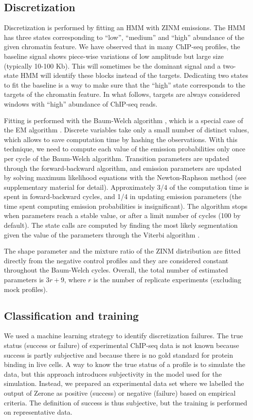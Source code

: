 \documentclass{bioinfo}
\begin{document}
\begin{methods}
\subsection{Discretization}
Discretization is performed by fitting an HMM
with ZINM emissions. The HMM has three
states corresponding to ``low'', ``medium'' and ``high'' abundance of
the given chromatin feature. We have observed that in many ChIP-seq
profiles, the baseline signal shows piece-wise variations of low amplitude
but large size (typically 10-100 Kb). This will sometimes be the dominant
signal and a two-state HMM will identify these blocks instead of the
targets. Dedicating two states to fit the baseline is a way to make sure
that the ``high'' state corresponds to the targets of the chromatin
feature. In what follows, targets are always considered windows
with ``high'' abundance of ChIP-seq reads.

Fitting is performed with the Baum-Welch algorithm \citep{baum1966},
which is a special case of the EM algorithm
\citep{Dempster77maximumlikelihood}.
Discrete variables take only a small number of distinct values, which
allows to save computation time by hashing the observations. With this
technique, we need to compute each value of the emission probabilities
only once per cycle of the Baum-Welch algorithm. Transition parameters
are updated through the forward-backward algorithm, and emission
parameters are updated by solving maximum likelihood equations
with the Newton-Raphson method (see supplementary material for detail).
Approximately 3/4 of the computation time is spent in foward-backward
cycles, and 1/4 in updating emission parameters (the time spent computing
emission probabilities is insignificant). The algorithm stops when
parameters reach a stable value, or after a limit number of cycles (100
by default). The state calls are computed by finding the most likely
segmentation given the value of the parameters through the Viterbi
algorithm \citep{1054010}.

The shape parameter and the mixture ratio of the ZINM distribution
are fitted directly from the negative control profiles and they are
considered constant throughout the Baum-Welch cycles. Overall, the
total number of estimated parameters is $3r+9$, where $r$ is the
number of replicate experiments (excluding mock profiles).

\subsection{Classification and training}
\label{sub:training}
We used a machine learning strategy to identify discretization
failures. The true status (success or failure) of experimental ChIP-seq
data is not known because success is partly subjective and because
there is no gold standard for protein binding in live cells. A way to
know the true status of a profile is to simulate the data, but this
approach introduces subjectivity in the model used for the simulation.
Instead, we prepared an experimental data set where we labelled the
output of Zerone as positive (success) or negative (failure) based
on empirical criteria. The definition of success is thus subjective,
but the training is performed on representative data.


\end{methods}
\end{document}
